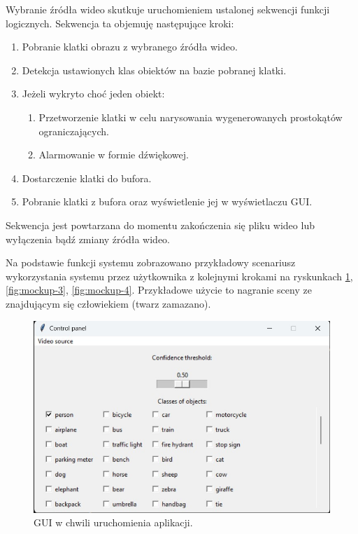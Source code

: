 Wybranie źródła wideo skutkuje uruchomieniem ustalonej sekwencji funkcji logicznych. Sekwencja ta objemuję następujące kroki:
\begin{enumerate}
    \item Pobranie klatki obrazu z wybranego źródła wideo.
    \item Detekcja ustawionych klas obiektów na bazie pobranej klatki.
    \item Jeżeli wykryto choć jeden obiekt:
    \begin{enumerate}
        \item Przetworzenie klatki w celu narysowania wygenerowanych prostokątów ograniczających. 
        \item Alarmowanie w formie dźwiękowej. 
    \end{enumerate}
    \item Dostarczenie klatki do bufora.
    \item Pobranie klatki z bufora oraz wyświetlenie jej w wyświetlaczu GUI.
\end{enumerate} 
Sekwencja jest powtarzana do momentu zakończenia się pliku wideo lub wyłączenia bądź zmiany źródła wideo. 

Na podstawie funkcji systemu zobrazowano przykładowy scenariusz wykorzystania systemu przez użytkownika z kolejnymi krokami na ryskunkach \ref{fig:mockup-2}, \ref{fig:mockup-3}, \ref{fig:mockup-4}. Przykładowe użycie to nagranie sceny ze znajdującym się człowiekiem (twarz zamazano).

\begin{figure}[H]
    \centering
    \includegraphics[width=\linewidth]{r_implementacja/panel_sterowania/panel_mockup.jpg}
    \caption{GUI w chwili uruchomienia aplikacji.}
    \label{fig:mockup-2}
\end{figure}

